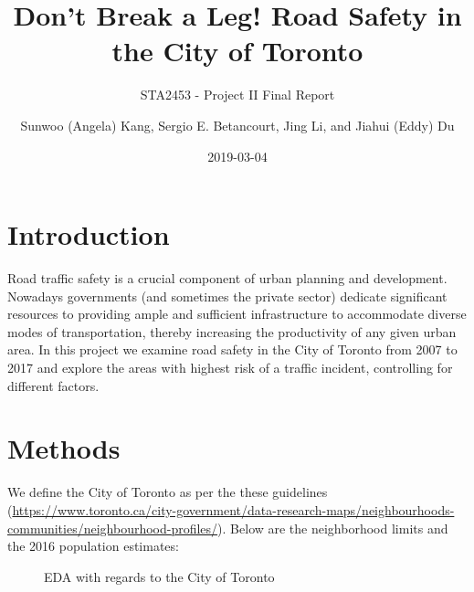 \documentclass[]{article}
\title{Don't Break a Leg! Road Safety in the City of Toronto}
\subtitle{STA2453 - Project II Final Report}
\author{Sunwoo (Angela) Kang, Sergio E. Betancourt, Jing Li, and Jiahui (Eddy)
Du}
\date{2019-03-04}
\begin{document}
\maketitle

\section{Introduction}\label{introduction}

Road traffic safety is a crucial component of urban planning and
development. Nowadays governments (and sometimes the private sector)
dedicate significant resources to providing ample and sufficient
infrastructure to accommodate diverse modes of transportation, thereby
increasing the productivity of any given urban area. In this project we
examine road safety in the City of Toronto from 2007 to 2017 and explore
the areas with highest risk of a traffic incident, controlling for
different factors.

\section{Methods}\label{methods}

We define the City of Toronto as per the these guidelines
(\url{https://www.toronto.ca/city-government/data-research-maps/neighbourhoods-communities/neighbourhood-profiles/}).
Below are the neighborhood limits and the 2016 population estimates:

\begin{figure}[H]

{\centering {}

}

\caption{\label{fig:figs}EDA with regards to the City of Toronto}\label{fig:unnamed-chunk-2}
\end{figure}
\end{document}
